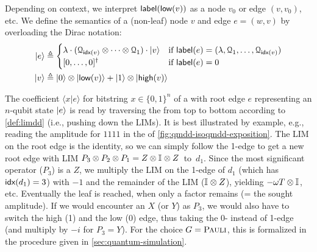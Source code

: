 \begin{definition}[$G$-\limdd]
\begin{itemize}
\end{itemize}
Depending on context, we interpret $\textsf{label}(\textsf{low}(v))$ as a node $v_0$ or edge  $(v, v_0)$, etc.
We define the semantics of a (non-leaf) node $v$ and edge $e=(w,v)$  by overloading the Dirac notation:
\begin{align*}
\ket{e} & \triangleq \begin{cases}
    \lambda \cdot  (\mathcal{Q}_{\textsf{idx}(v)}\otimes \cdots \otimes \mathcal{Q}_1) \cdot \ket v & \text{if $\textsf{label}(e) = (\lambda,  \mathcal{Q}_1, \ldots , \mathcal{Q}_{\textsf{idx}(v)})$} \\
	[0, \dots,0]^\dagger & \text{if $\textsf{label}(e)=0$} \end{cases} \\
\ket{v}     & \triangleq \ket{0}\otimes\ket{\textsf{low}(v)}+ \ket{1}\otimes \ket{\textsf{high}(v)}
\end{align*}
\end{definition}

The coefficient $\langle x | e \rangle$ for bitstring $x \in \{0, 1\}^n$ 
of a \limdd with root edge $e$ representing an $n$-qubit state $\ket e$ 
is read by traversing the \limdd from top to bottom according to \autoref{def:limdd}
(i.e., pushing down the LIMs).
It is best illustrated by example, e.g., reading the amplitude for $1111$ in the \limdd of
\autoref{fig:qmdd-isoqmdd-exposition}. The LIM on the root edge is the identity, so we can simply follow the 1-edge to get a new root edge with LIM $P_3\otimes P_2 \otimes P_1 =Z\otimes \mathbb{I}_{} \otimes Z$~to~$d_1$. 
Since the most significant operator ($P_3$) is a $Z$, we multiply the LIM on the 1-edge of $d_1$ (which has $\textsf{idx}(d_1)=3$) with $-1$ and the remainder of the LIM ($\mathbb{I}_{} \otimes Z$),
yielding $ - \omega T \otimes \mathbb{I}_{}$, etc. Eventually the leaf is reached, when only a factor remains (= the sought amplitude).
If we would encounter an $X$ (or $Y$) as $P_3$, we would also have to switch the high (1)
and the low (0) edge, thus taking the 0- instead of 1-edge (and multiply by $-i$ for $P_3 = Y$).
For the choice $G=\textsc{Pauli}$, this is formalized in the \follow{}{} procedure given in \autoref{sec:quantum-simulation}.

